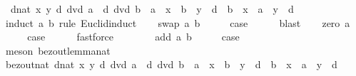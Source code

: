 \begin{isabellebody}
\ \ {\isachardoublequoteopen}{\isasymexists}{\isacharparenleft}{\kern0pt}d{\isacharcolon}{\kern0pt}{\isacharcolon}{\kern0pt}nat{\isacharparenright}{\kern0pt}\ x\ y{\isachardot}{\kern0pt}\ d\ dvd\ a\ {\isasymand}\ d\ dvd\ b\ {\isasymand}\ {\isacharparenleft}{\kern0pt}a\ {\isacharasterisk}{\kern0pt}\ x\ {\isacharequal}{\kern0pt}\ b\ {\isacharasterisk}{\kern0pt}\ y\ {\isacharplus}{\kern0pt}\ d\ {\isasymor}\ b\ {\isacharasterisk}{\kern0pt}\ x\ {\isacharequal}{\kern0pt}\ a\ {\isacharasterisk}{\kern0pt}\ y\ {\isacharplus}{\kern0pt}\ d{\isacharparenright}{\kern0pt}{\isachardoublequoteclose}\isanewline
%
\isadelimproof
%
\endisadelimproof
%
\isatagproof
{}\isamarkupfalse%
\ {\isacharparenleft}{\kern0pt}induct\ a\ b\ rule{\isacharcolon}{\kern0pt}\ Euclid{\isacharunderscore}{\kern0pt}induct{\isacharparenright}{\kern0pt}\isanewline
\ \ \isamarkupfalse%
\ {\isacharparenleft}{\kern0pt}swap\ a\ b{\isacharparenright}{\kern0pt}\isanewline
\ \ \isamarkupfalse%
\ \isamarkupfalse%
\ {\isacharquery}{\kern0pt}case\isanewline
\ \ \ \ \isamarkupfalse%
\ blast\isanewline
{}\isamarkupfalse%
\isanewline
\ \ \isamarkupfalse%
\ {\isacharparenleft}{\kern0pt}zero\ a{\isacharparenright}{\kern0pt}\isanewline
\ \ \isamarkupfalse%
\ \isamarkupfalse%
\ {\isacharquery}{\kern0pt}case\isanewline
\ \ \ \ \isamarkupfalse%
\ fastforce\ \ \ \ \isanewline
{}\isamarkupfalse%
\isanewline
\ \ \isamarkupfalse%
\ {\isacharparenleft}{\kern0pt}add\ a\ b{\isacharparenright}{\kern0pt}\isanewline
\ \ \isamarkupfalse%
\ \isamarkupfalse%
\ {\isacharquery}{\kern0pt}case\isanewline
\ \ \ \ \isamarkupfalse%
\ {\isacharparenleft}{\kern0pt}meson\ bezout{\isacharunderscore}{\kern0pt}lemma{\isacharunderscore}{\kern0pt}nat{\isacharparenright}{\kern0pt}\isanewline
{}\isamarkupfalse%
%
\endisatagproof
{\isafoldproof}%
%
\isadelimproof
\isanewline
%
\endisadelimproof
\isanewline
{}\isamarkupfalse%
\ bezout{}{\isacharunderscore}{\kern0pt}nat{\isacharcolon}{\kern0pt}\ {\isachardoublequoteopen}{\isasymexists}{\isacharparenleft}{\kern0pt}d{\isacharcolon}{\kern0pt}{\isacharcolon}{\kern0pt}nat{\isacharparenright}{\kern0pt}\ x\ y{\isachardot}{\kern0pt}\ d\ dvd\ a\ {\isasymand}\ d\ dvd\ b\ {\isasymand}\ {\isacharparenleft}{\kern0pt}a\ {\isacharasterisk}{\kern0pt}\ x\ {\isacharminus}{\kern0pt}\ b\ {\isacharasterisk}{\kern0pt}\ y\ {\isacharequal}{\kern0pt}\ d\ {\isasymor}\ b\ {\isacharasterisk}{\kern0pt}\ x\ {\isacharminus}{\kern0pt}\ a\ {\isacharasterisk}{\kern0pt}\ y\ {\isacharequal}{\kern0pt}\ d{\isacharparenright}{\kern0pt}{\isachardoublequoteclose}\isanewline

\end{isabellebody}
